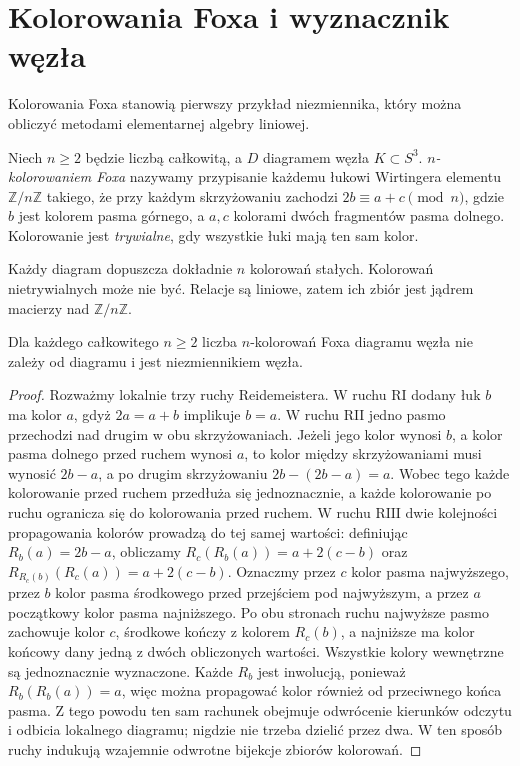 \section{Kolorowania Foxa i wyznacznik węzła}
\label{sec:kt-fox}

Kolorowania Foxa stanowią pierwszy przykład niezmiennika, który
można obliczyć metodami elementarnej algebry liniowej.

\begin{definicja}
Niech $n\geq2$ będzie liczbą całkowitą, a $D$ diagramem węzła
$K\subset S^3$. \emph{$n$-kolorowaniem Foxa} nazywamy przypisanie
każdemu łukowi Wirtingera elementu $\mathbb Z/n\mathbb Z$ takiego,
że przy każdym skrzyżowaniu zachodzi
$2b\equiv a+c\pmod n$, gdzie $b$ jest kolorem pasma górnego,
a $a,c$ kolorami dwóch fragmentów pasma dolnego.
Kolorowanie jest \emph{trywialne}, gdy wszystkie łuki mają ten sam kolor.
\end{definicja}

Każdy diagram dopuszcza dokładnie $n$ kolorowań stałych.
Kolorowań nietrywialnych może nie być. Relacje są liniowe,
zatem ich zbiór jest jądrem macierzy nad $\mathbb Z/n\mathbb Z$.

\begin{stwierdzenie}
Dla każdego całkowitego $n\geq2$ liczba $n$-kolorowań Foxa diagramu
węzła nie zależy od diagramu i jest niezmiennikiem węzła.
\end{stwierdzenie}


\begin{proof}
Rozważmy lokalnie trzy ruchy Reidemeistera. W ruchu $\mathrm{R I}$
dodany łuk $b$ ma kolor $a$, gdyż $2a=a+b$ implikuje $b=a$.
W ruchu $\mathrm{R II}$ jedno pasmo przechodzi nad drugim
w obu skrzyżowaniach. Jeżeli jego kolor wynosi $b$,
a kolor pasma dolnego przed ruchem wynosi $a$, to
kolor między skrzyżowaniami musi wynosić $2b-a$,
a po drugim skrzyżowaniu $2b-(2b-a)=a$.
Wobec tego każde kolorowanie przed ruchem przedłuża
się jednoznacznie, a każde kolorowanie po ruchu
ogranicza się do kolorowania przed ruchem.
W ruchu $\mathrm{R III}$ dwie kolejności propagowania kolorów
prowadzą do tej samej wartości: definiując $R_b(a)=2b-a$,
obliczamy $R_c(R_b(a))=a+2(c-b)$ oraz
$R_{R_c(b)}(R_c(a))=a+2(c-b)$. Oznaczmy przez $c$ kolor pasma najwyższego, przez $b$
kolor pasma środkowego przed przejściem pod najwyższym,
a przez $a$ początkowy kolor pasma najniższego.
Po obu stronach ruchu najwyższe pasmo zachowuje kolor
$c$, środkowe kończy z kolorem $R_c(b)$, a najniższe
ma kolor końcowy dany jedną z dwóch obliczonych wartości.
Wszystkie kolory wewnętrzne są jednoznacznie wyznaczone.
Każde $R_b$ jest inwolucją, ponieważ $R_b(R_b(a))=a$,
więc można propagować kolor również od przeciwnego końca
pasma. Z tego powodu ten sam rachunek obejmuje odwrócenie
kierunków odczytu i odbicia lokalnego diagramu;
nigdzie nie trzeba dzielić przez dwa. W ten sposób
ruchy indukują wzajemnie odwrotne bijekcje zbiorów kolorowań.
\end{proof}

